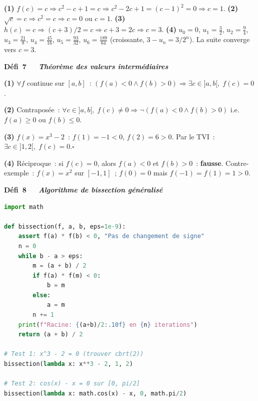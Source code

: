 \textbf{(1)} $f(c)=c\Rightarrow c^2-c+1=c\Rightarrow c^2-2c+1=(c-1)^2=0\Rightarrow c=1$.
\textbf{(2)} $\sqrt{c}=c\Rightarrow c^2=c\Rightarrow c=0$ ou $c=1$.
\textbf{(3)} $h(c)=c\Rightarrow(c+3)/2=c\Rightarrow c+3=2c\Rightarrow c=3$.
\textbf{(4)} $u_0=0$, $u_1=\frac32$, $u_2=\frac94$, $u_3=\frac{21}8$, $u_4=\frac{45}{16}$, $u_5=\frac{93}{32}$, $u_6=\frac{189}{64}$ (croissante, $3-u_n=3/2^n$).
La suite converge vers $c=3$.

\noindent{}
{\color{BO}\bfseries\small D\'efi~7~\textendash\ \textit{\logiq\ Th\'eor\`eme des valeurs interm\'ediaires}}
\par\smallskip

\textbf{(1)} $\forall f$ continue sur $[a,b]$~:
$(f(a)<0\wedge f(b)>0)\Rightarrow\exists c\in]a,b[,\;f(c)=0$.

\textbf{(2)} Contrapos\'ee~: $\forall c\in]a,b[,\;f(c)\ne0\Rightarrow\neg(f(a)<0\wedge f(b)>0)$
i.e. $f(a)\geq0$ ou $f(b)\leq0$.

\textbf{(3)} $f(x)=x^3-2$~: $f(1)=-1<0$, $f(2)=6>0$. Par le TVI~:
$\exists c\in]1,2[,\;f(c)=0$.\hfill$\square$

\textbf{(4)} R\'eciproque~: \og si $f(c)=0$, alors $f(a)<0$ et $f(b)>0$\fg~: \textbf{fausse}.
Contre-exemple~: $f(x)=x^2$ sur $[-1,1]$~; $f(0)=0$ mais $f(-1)=f(1)=1>0$.

\noindent{}
{\color{BO}\bfseries\small D\'efi~8~\textendash\ \textit{\algo\ Algorithme de bissection g\'en\'eralis\'e \computer}}
\par\smallskip

\begin{lstlisting}[language=Python]
import math

def bissection(f, a, b, eps=1e-9):
    assert f(a) * f(b) < 0, "Pas de changement de signe"
    n = 0
    while b - a > eps:
        m = (a + b) / 2
        if f(a) * f(m) < 0:
            b = m
        else:
            a = m
        n += 1
    print(f"Racine: {(a+b)/2:.10f} en {n} iterations")
    return (a + b) / 2

# Test 1: x^3 - 2 = 0 (trouver cbrt(2))
bissection(lambda x: x**3 - 2, 1, 2)

# Test 2: cos(x) - x = 0 sur [0, pi/2]
bissection(lambda x: math.cos(x) - x, 0, math.pi/2)
\end{lstlisting}


